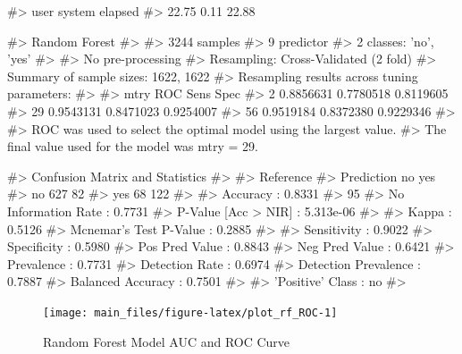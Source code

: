 \begin{Schunk}
\begin{Soutput}
#>    user  system elapsed 
#>   22.75    0.11   22.88
\end{Soutput}
\begin{Soutput}
#> Random Forest 
#> 
#> 3244 samples
#>    9 predictor
#>    2 classes: 'no', 'yes' 
#> 
#> No pre-processing
#> Resampling: Cross-Validated (2 fold) 
#> Summary of sample sizes: 1622, 1622 
#> Resampling results across tuning parameters:
#> 
#>   mtry  ROC        Sens       Spec     
#>    2    0.8856631  0.7780518  0.8119605
#>   29    0.9543131  0.8471023  0.9254007
#>   56    0.9519184  0.8372380  0.9229346
#> 
#> ROC was used to select the optimal model using the largest value.
#> The final value used for the model was mtry = 29.
\end{Soutput}
\end{Schunk}

\begin{Schunk}
\begin{Soutput}
#> Confusion Matrix and Statistics
#> 
#>           Reference
#> Prediction  no yes
#>        no  627  82
#>        yes  68 122
#>                                          
#>                Accuracy : 0.8331         
#>                  95%
#>     No Information Rate : 0.7731         
#>     P-Value [Acc > NIR] : 5.313e-06      
#>                                          
#>                   Kappa : 0.5126         
#>  Mcnemar's Test P-Value : 0.2885         
#>                                          
#>             Sensitivity : 0.9022         
#>             Specificity : 0.5980         
#>          Pos Pred Value : 0.8843         
#>          Neg Pred Value : 0.6421         
#>              Prevalence : 0.7731         
#>          Detection Rate : 0.6974         
#>    Detection Prevalence : 0.7887         
#>       Balanced Accuracy : 0.7501         
#>                                          
#>        'Positive' Class : no             
#> 
\end{Soutput}
\end{Schunk}

\begin{Schunk}
\begin{figure}[H]

{\centering \texttt{[image: main\_files/figure-latex/plot\_rf\_ROC-1]} 

}

\caption[Random Forest Model AUC and ROC Curve]{Random Forest Model AUC and ROC Curve}\label{fig:plot_rf_ROC}
\end{figure}
\end{Schunk}

